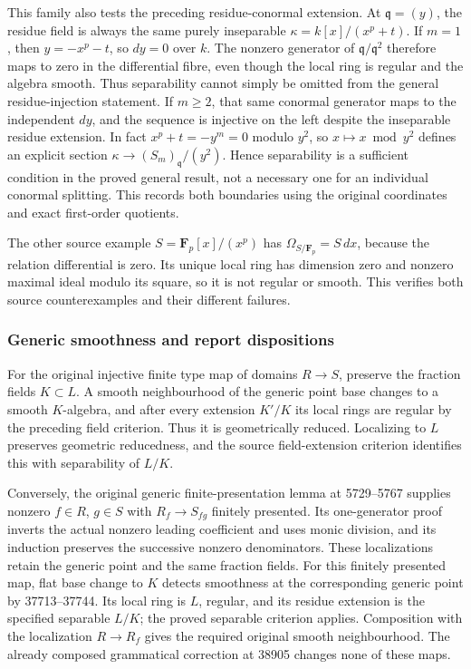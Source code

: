 This family also tests the preceding residue-conormal extension. At \(\mathfrak q=(y)\), the residue field is always the same purely inseparable \(\kappa=k[x]/(x^p+t)\). If \(m=1\), then \(y=-x^p-t\), so \(dy=0\) over \(k\). The nonzero generator of \(\mathfrak q/\mathfrak q^2\) therefore maps to zero in the differential fibre, even though the local ring is regular and the algebra smooth. Thus separability cannot simply be omitted from the general residue-injection statement. If \(m\ge2\), that same conormal generator maps to the independent \(dy\), and the sequence is injective on the left despite the inseparable residue extension. In fact \(x^p+t=-y^m=0\) modulo \(y^2\), so \(x\mapsto x\bmod y^2\) defines an explicit section \(\kappa\to(S_m)_{\mathfrak q}/(y^2)\). Hence separability is a sufficient condition in the proved general result, not a necessary one for an individual conormal splitting. This records both boundaries using the original coordinates and exact first-order quotients.

The other source example \(S=\mathbf F_p[x]/(x^p)\) has \(\Omega_{S/\mathbf F_p}=S\,dx\), because the relation differential is zero. Its unique local ring has dimension zero and nonzero maximal ideal modulo its square, so it is not regular or smooth. This verifies both source counterexamples and their different failures.

\subsubsection{Generic smoothness and report dispositions}\label{generic-smoothness-and-report-dispositions}

For the original injective finite type map of domains \(R\to S\), preserve the fraction fields \(K\subset L\). A smooth neighbourhood of the generic point base changes to a smooth \(K\)-algebra, and after every extension \(K'/K\) its local rings are regular by the preceding field criterion. Thus it is geometrically reduced. Localizing to \(L\) preserves geometric reducedness, and the source field-extension criterion identifies this with separability of \(L/K\).

Conversely, the original generic finite-presentation lemma at 5729--5767 supplies nonzero \(f\in R\), \(g\in S\) with \(R_f\to S_{fg}\) finitely presented. Its one-generator proof inverts the actual nonzero leading coefficient and uses monic division, and its induction preserves the successive nonzero denominators. These localizations retain the generic point and the same fraction fields. For this finitely presented map, flat base change to \(K\) detects smoothness at the corresponding generic point by 37713--37744. Its local ring is \(L\), regular, and its residue extension is the specified separable \(L/K\); the proved separable criterion applies. Composition with the localization \(R\to R_f\) gives the required original smooth neighbourhood. The already composed grammatical correction at 38905 changes none of these maps.

